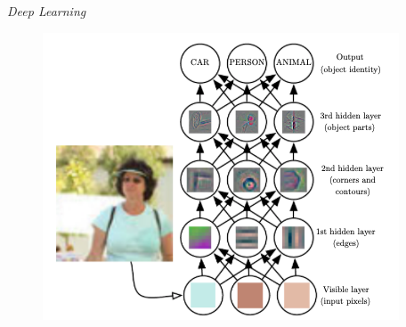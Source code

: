 \documentclass[aspectratio=169]{beamer}
\begin{document}
\begin{frame}{\textit{Deep Learning}}
	\begin{figure}[h]
	  \centering
	  \includegraphics[width=.5 \textwidth]{imgs/hierarquia-conceitos-dl.png}
	  \label{hierarquia-conceitos}
	 \end{figure}
\end{frame}




           
           
	


\end{document}
